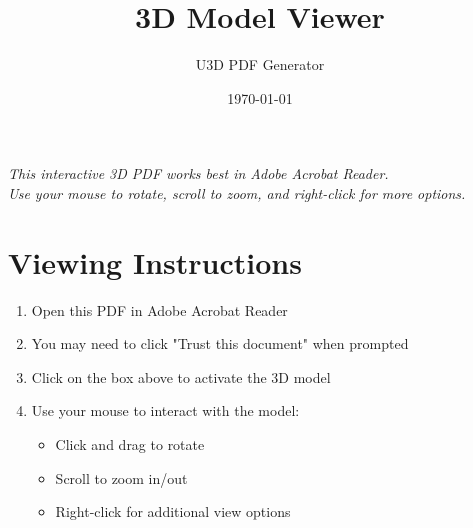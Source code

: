 \documentclass{article}
\title{3D Model Viewer}
\author{U3D PDF Generator}
\date{\today}
\begin{document}
\maketitle

\begin{center}
\end{center}

\vspace{1cm}

\begin{center}
\textit{This interactive 3D PDF works best in Adobe Acrobat Reader.\\
Use your mouse to rotate, scroll to zoom, and right-click for more options.}
\end{center}

\section*{Viewing Instructions}
\begin{enumerate}
    \item Open this PDF in Adobe Acrobat Reader
    \item You may need to click "Trust this document" when prompted
    \item Click on the box above to activate the 3D model
    \item Use your mouse to interact with the model:
    \begin{itemize}
        \item Click and drag to rotate
        \item Scroll to zoom in/out
        \item Right-click for additional view options
    \end{itemize}
\end{enumerate}

\end{document}
